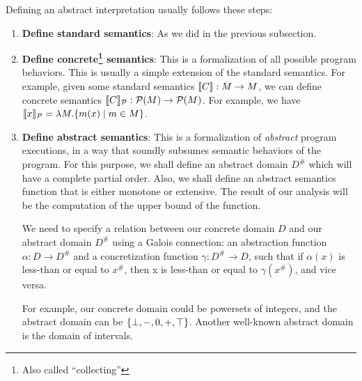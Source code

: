 Defining an abstract interpretation usually follows these steps:
\begin{enumerate}
\item \textbf{Define standard semantics}: As we did in the previous subsection.
\item \textbf{Define concrete\footnote{Also called ``collecting''} semantics}: This is a formalization
of all possible program behaviors. This is usually a simple extension of the standard
semantics. For example, given some standard semantics $\llbracket C \rrbracket : M \to M$, we
can define concrete semantics $\llbracket C \rrbracket_\mathcal{P} : \mathcal{P}(M) \to \mathcal{P}(M)$.
For example, we have $\llbracket x \rrbracket_\mathcal{P} = \lambda M. \{m(x) \mid m \in M\}$.
\item \textbf{Define abstract semantics}: This is a formalization of
\emph{abstract} program executions, in a way that soundly subsumes semantic behaviors
of the program.
For this purpose, we shall define an abstract domain $D^\#$ which will have a complete partial order.
Also, we shall define an abstract semantics function that is either monotone or extensive.
The result of our analysis will be the computation of the upper bound of the function.

We need to specify a relation between our concrete domain $D$ and our abstract domain $D^\#$
using a Galois connection: an abstraction function $\alpha : D \to D^\#$ and
a concretization function $\gamma : D^\# \to D$, such that if $\alpha(x)$ is less-than
or equal to $x^\#$, then x is less-than or equal to $\gamma(x^\#)$, and vice versa.

For example, our concrete domain could be powersets of integers, and the abstract domain
can be $\{\perp, -, 0, +, \top\}$. Another well-known abstract domain is the domain of intervals.
\end{enumerate}
